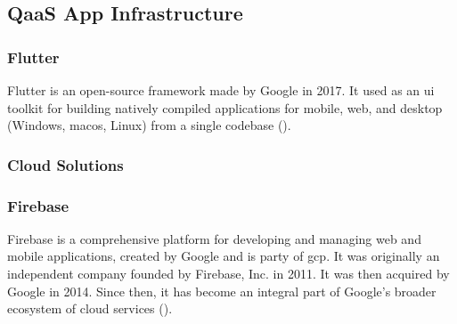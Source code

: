 \begin{multicols}{2}
      \subsection{QaaS App Infrastructure}
      \subsubsection{Flutter}
      Flutter is an open-source framework made by Google in 2017. It used as an \acrshort{ui} toolkit for building
      natively compiled applications for mobile, web, and desktop (Windows, mac\acrshort{os}, Linux) from a single
      codebase (\cite{flutter}).

      \subsubsection{Cloud Solutions}
      \subsubsection{Firebase}
      Firebase is a comprehensive platform for developing and managing web and mobile applications, created by
      Google and is party of \acrshort{gcp}. It was originally an independent company founded by Firebase, Inc.
      in 2011. It was then acquired by Google in 2014. Since then, it has become an integral part of Google's
      broader ecosystem of cloud services (\cite{firebase}).


\end{multicols}
